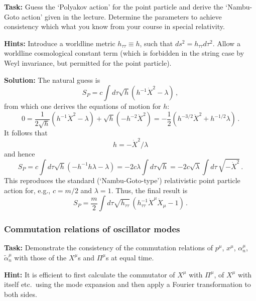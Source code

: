 \documentclass[12pt]{article}
\newcommand{\be}{\begin{equation}}
\newcommand{\ee}{\end{equation}}
\numberwithin{equation}{section}
\begin{document}
{\bf Task:} Guess the `Polyakov action' for the point particle and derive the `Nambu-Goto action' given in the lecture. Determine the parameters to achieve consistency which what you know from your course in special relativity.

\noindent
{\bf Hints:} Introduce a worldline metric $h_{\tau\tau} \equiv h$, such that $ds^2= h_{\tau\tau}d\tau^2$. Allow a worldline cosmological constant term (which is forbidden in the string case by Weyl invariance, but permitted for the point particle).

\noindent
{\bf Solution:} The natural guess is
\be
S_P=c\int d\tau \sqrt{h}(h^{-1}\dot{X}^2-\lambda)\,, 
\ee
from which one derives the equations of motion for $h$:
\be
0=\frac{1}{2\sqrt{h}}(h^{-1}\dot{X}^2-\lambda)+\sqrt{h}(-h^{-2}\dot{X}^2)
= -\frac{1}{2}(h^{-3/2}\dot{X}^2+h^{-1/2}\lambda)\,.
\ee
It follows that 
\be
h=-\dot{X}^2/\lambda
\ee
and hence
\be
S_P=c\int d\tau\sqrt{h}(-h^{-1}h\lambda-\lambda)=-2c\lambda\int d\tau\sqrt{h}
=-2c\sqrt{\lambda}\int d\tau\,\sqrt{-\dot{X}^2}\,.
\ee
This reproduces the standard (`Nambu-Goto-type') relativistic point particle action for, e.g., 
$c=m/2$ and $\lambda=1$. Thus, the final result is
\be
S_P=\frac{m}{2}\int d\tau\sqrt{h_{\tau\tau}}\,\left(h_{\tau\tau}^{-1} \dot{X}^\mu \dot{X}_\mu -1\right)\,.
\ee






\subsubsection{Commutation relations of oscillator modes}

{\bf Task:} Demonstrate the consistency of the commutation relations of $p^\mu$, $x^\mu$, $\alpha_n^\mu$, $\tilde{\alpha}_n^\mu$ with those of the $X^\mu$s and $\Pi^\mu$s at equal time.

\noindent
{\bf Hint:} It is efficient to first calculate the commutator of $X^\mu$ with $\Pi^\mu$, of $X^\mu$ with itself etc.~using the mode expansion and then apply a Fourier transformation to both sides.
\end{document}
